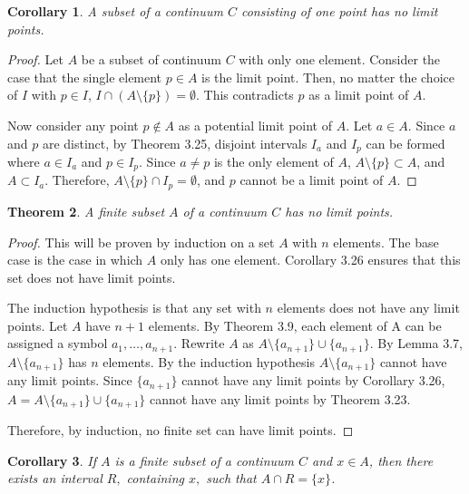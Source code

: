 \documentclass{amsart}
\newtheorem{theorem}{Theorem}
\newtheorem{corollary}[theorem]{Corollary}
\newcommand{\1}{\mathds{1}}
\numberwithin{equation}{section}
\numberwithin{theorem}{section}
\begin{document}
\begin{corollary}  A subset of a continuum $C$ consisting of one point has no limit points.
\end{corollary}

\begin{proof}
	Let $A$ be a subset of continuum $C$ with only one element.  Consider the case that the single element $p\in A$ is the limit point. Then, no matter the choice of $I$ with $p\in I$, $I\cap (A\setminus\{p\}) = \emptyset$. This contradicts $p$ as a limit point of $A$. 
	
	Now consider any point $p\notin A$ as a potential limit point of $A$. Let $a\in A$. Since $a$ and $p$ are distinct, by Theorem 3.25, disjoint intervals $I_a$ and $I_p$ can be formed where $a\in I_a$ and $p\in I_p$. Since $a\not=p$ is the only element of $A$, $A\setminus \{p\} \subset A$, and $A\subset I_a$. Therefore, $A\setminus\{p\}\cap I_p = \emptyset$, and $p$ cannot be a limit point of $A$.
\end{proof}

\begin{theorem} A finite subset $A$ of a continuum $C$ has no limit points.
\end{theorem}

\begin{proof}
	This will be proven by induction on a set $A$ with $n$ elements. The base case is the case in which $A$ only has one element. Corollary 3.26 ensures that this set does not have limit points. 
	
	The induction hypothesis is that any set with $n$ elements does not have any limit points. Let $A$ have $n+1$ elements. By Theorem 3.9, each element of A can be assigned a symbol $a_1, \dotsc, a_{n+1}$. Rewrite $A$ as $A\setminus\{a_{n+1}\}\cup \{a_{n+1}\}$. By Lemma 3.7, $A\setminus\{a_{n+1}\}$ has $n$ elements. By the induction hypothesis $A\setminus\{a_{n+1}\}$ cannot have any limit points. Since $\{a_{n+1}\}$ cannot have any limit points by Corollary 3.26, $A =A\setminus\{a_{n+1}\}\cup \{a_{n+1}\}$ cannot have any limit points by Theorem 3.23. 
	
	Therefore, by induction, no finite set can have limit points.
\end{proof}

\begin{corollary}  If $A$ is a finite subset of a continuum $C$ and $x \in A$, then there exists an interval $R,$ containing $x,$ such that $A \cap R = \{ x \}$.
\end{corollary}
\end{document}
